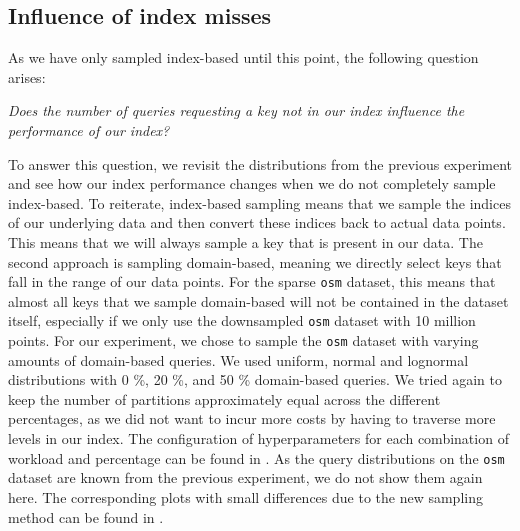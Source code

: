 \subsection{Influence of index misses}

\begin{minipage}{\textwidth}
As we have only sampled index-based until this point, the following question arises:

\begin{center}
    \textit{Does the number of queries requesting a key not in our index influence the performance of our index?}
\end{center}

\end{minipage}

\noindent To answer this question, we revisit the distributions from the previous experiment and see how our index performance changes when we do not completely sample index-based. To reiterate, index-based sampling means that we sample the indices of our underlying data and then convert these indices back to actual data points. This means that we will always sample a key that is present in our data. The second approach is sampling domain-based, meaning we directly select keys that fall in the range of our data points. For the sparse \verb|osm| dataset, this means that almost all keys that we sample domain-based will not be contained in the dataset itself, especially if we only use the downsampled \verb|osm| dataset with 10 million points. For our experiment, we chose to sample the \verb|osm| dataset with varying amounts of domain-based queries. We used uniform, normal and lognormal distributions with 0 \%, 20 \%, and 50 \% domain-based queries. We tried again to keep the number of partitions approximately equal across the different percentages, as we did not want to incur more costs by having to traverse more levels in our index. The configuration of hyperparameters for each combination of workload and percentage can be found in . As the query distributions on the \verb|osm| dataset are known from the previous experiment, we do not show them again here. The corresponding plots with small differences due to the new sampling method can be found in .

